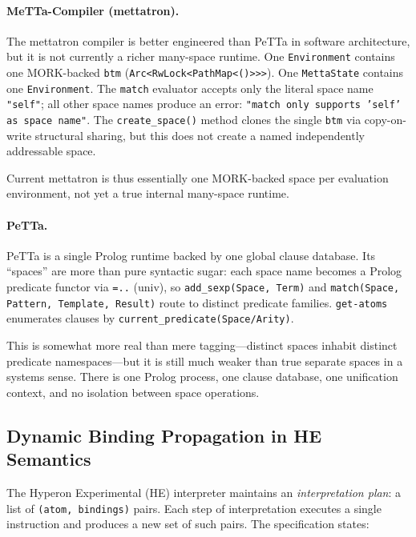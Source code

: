 \documentclass[11pt]{article}
\theoremstyle{remark}
\newcommand{\MORK}{\textup{MORK}}
\newcommand{\PeTTa}{\textup{PeTTa}}
\newcommand{\HE}{\textup{HE}}
\newcommand{\code}[1]{\texttt{#1}}
\begin{document}
\paragraph{MeTTa-Compiler (mettatron).}
The mettatron compiler is better engineered than \PeTTa{} in software
architecture, but it is not currently a richer many-space runtime.
One \code{Environment} contains one \MORK-backed \code{btm}
(\code{Arc<RwLock<PathMap<()>>>}).  One \code{MettaState} contains one
\code{Environment}.  The \code{match} evaluator accepts only the literal
space name \code{"self"}; all other space names produce an error:
\code{"match only supports 'self' as space name"}.
The \code{create\_space()} method clones the single \code{btm} via
copy-on-write structural sharing, but this does not create a named
independently addressable space.

Current mettatron is thus essentially one \MORK-backed space per evaluation
environment, not yet a true internal many-space runtime.

\paragraph{\PeTTa{}.}
\PeTTa{} is a single Prolog runtime backed by one global clause database.
Its ``spaces'' are more than pure syntactic sugar: each space name becomes
a Prolog predicate functor via \code{=..} (univ), so \code{add\_sexp(Space,
Term)} and \code{match(Space, Pattern, Template, Result)} route to
distinct predicate families.  \code{get-atoms} enumerates clauses by
\code{current\_predicate(Space/Arity)}.

This is somewhat more real than mere tagging---distinct spaces inhabit
distinct predicate namespaces---but it is still much weaker than true
separate spaces in a systems sense.  There is one Prolog process, one
clause database, one unification context, and no isolation between space
operations.

\subsection{Dynamic Binding Propagation in \HE{} Semantics}

The Hyperon Experimental (\HE{}) interpreter maintains an
\emph{interpretation plan}: a list of \code{(atom, bindings)} pairs.
Each step of interpretation executes a single instruction and produces a
new set of such pairs.  The specification states:
\end{document}
